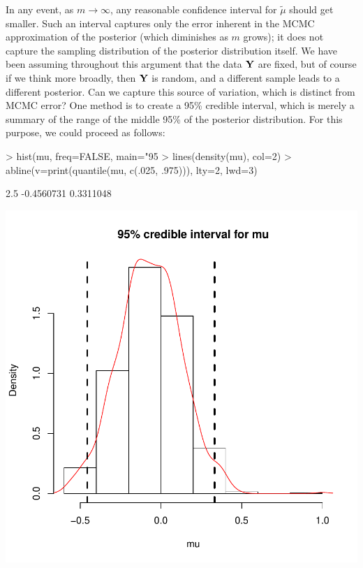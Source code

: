 \documentclass{article}
\def\vec#1{\mathchoice{\mbox{\boldmath$\displaystyle\bf#1$}}
{\mbox{\boldmath$\textstyle\bf#1$}}
{\mbox{\boldmath$\scriptstyle\bf#1$}}
{\mbox{\boldmath$\scriptscriptstyle\bf#1$}}}
\begin{document}
In any event, as $m\to\infty$, any reasonable confidence interval for $\tilde\mu$ should get smaller.  
Such an interval captures only the error inherent in the MCMC approximation of the posterior (which diminishes as $m$ grows);
it does not capture the sampling distribution of the posterior distribution itself.  We have been assuming throughout this argument that
the data $\vec Y$ are fixed, but of course if we think more broadly, then $\vec Y$ is random, and a different sample leads to a different posterior.
Can we capture this source of variation, which is distinct from MCMC error?  One method is to create a 95\% credible interval, which is merely
a summary of the range of the middle 95\% of the posterior distribution.  For this purpose, we could proceed as follows:
\begin{Schunk}
\begin{Sinput}
> hist(mu, freq=FALSE, main="95%
> lines(density(mu), col=2)
> abline(v=print(quantile(mu, c(.025, .975))), lty=2, lwd=3)
\end{Sinput}
\begin{Soutput}
      2.5%
-0.4560731  0.3311048 
\end{Soutput}
\end{Schunk}
\includegraphics{MCMCexample-007}
\end{document}
